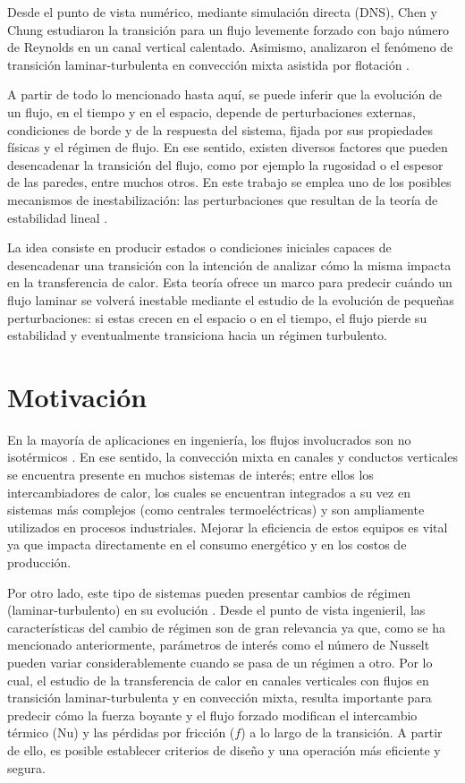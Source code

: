 Desde el punto de vista numérico, mediante simulación directa (DNS), Chen y Chung \cite{chen2002direct} estudiaron la transición para un flujo levemente forzado con bajo número de Reynolds en un canal vertical calentado. Asimismo, analizaron el fenómeno de transición laminar-turbulenta en convección mixta asistida por flotación \cite{chen2003direct}.

A partir de todo lo mencionado hasta aquí, se puede inferir que la evolución de un flujo, en el tiempo y en el espacio, depende de perturbaciones externas, condiciones de borde y de la respuesta del sistema, fijada por sus propiedades físicas y el régimen de flujo. En ese sentido, existen diversos factores que pueden desencadenar la transición del flujo, como por ejemplo la rugosidad o el espesor de las paredes, entre muchos otros. En este trabajo se emplea uno de los posibles mecanismos de inestabilización: las perturbaciones que resultan de la teoría de estabilidad lineal \cite{schmid}. 

La idea consiste en producir estados o condiciones iniciales capaces de desencadenar una transición con la intención de analizar cómo la misma impacta en la transferencia de calor. Esta teoría ofrece un marco para predecir cuándo un flujo laminar se volverá inestable mediante el estudio de la evolución de pequeñas perturbaciones: si estas crecen en el espacio o en el tiempo, el flujo pierde su estabilidad y eventualmente transiciona hacia un régimen turbulento.


\section{Motivación}

En la mayoría de aplicaciones en ingeniería, los flujos involucrados son no isotérmicos \cite{chen2003direct}. En ese sentido, la convección mixta en canales y conductos verticales se encuentra presente en muchos sistemas de interés; entre ellos los intercambiadores de calor, los cuales se encuentran integrados a su vez en sistemas más complejos (como centrales termoeléctricas) y son ampliamente utilizados en procesos industriales. Mejorar la eficiencia de estos equipos es vital ya que impacta directamente en el consumo energético y en los costos de producción.

Por otro lado, este tipo de sistemas pueden presentar cambios de régimen (laminar-turbulento) en su evolución \cite{schlatter2005}. Desde el punto de vista ingenieril, las características del cambio de régimen son de gran relevancia ya que, como se ha mencionado anteriormente, parámetros de interés como el número de Nusselt pueden variar considerablemente cuando se pasa de un régimen a otro. Por lo cual, el estudio de la transferencia de calor en canales verticales con flujos en transición laminar-turbulenta y en convección mixta, resulta importante para predecir cómo la fuerza boyante y el flujo forzado modifican el intercambio térmico (Nu) y las pérdidas por fricción ($f$) a lo largo de la transición. A partir de ello, es posible establecer criterios de diseño y una operación más eficiente y segura.




